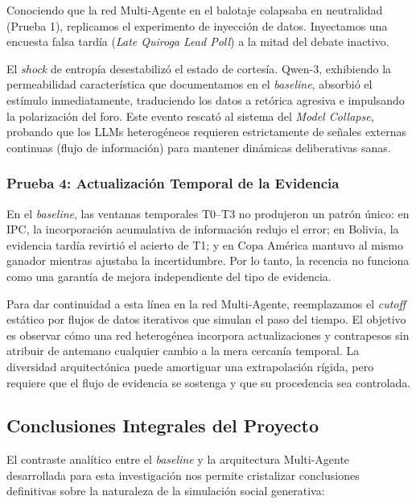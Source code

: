 \documentclass{article}
\begin{document}
Conociendo que la red Multi-Agente en el balotaje colapsaba en neutralidad (Prueba 1), replicamos el experimento de inyección de datos. Inyectamos una encuesta falsa tardía (\textit{Late Quiroga Lead Poll}) a la mitad del debate inactivo.

El \textit{shock} de entropía desestabilizó el estado de cortesía. Qwen-3, exhibiendo la permeabilidad característica que documentamos en el \textit{baseline}, absorbió el estímulo inmediatamente, traduciendo los datos a retórica agresiva e impulsando la polarización del foro. Este evento rescató al sistema del \textit{Model Collapse}, probando que los LLMs heterogéneos requieren estrictamente de señales externas continuas (flujo de información) para mantener dinámicas deliberativas sanas.

\subsubsection{Prueba 4: Actualización Temporal de la Evidencia}

En el \textit{baseline}, las ventanas temporales T0--T3 no produjeron un patrón único: en IPC, la incorporación acumulativa de información redujo el error; en Bolivia, la evidencia tardía revirtió el acierto de T1; y en Copa América mantuvo al mismo ganador mientras ajustaba la incertidumbre. Por lo tanto, la recencia no funciona como una garantía de mejora independiente del tipo de evidencia.

Para dar continuidad a esta línea en la red Multi-Agente, reemplazamos el \textit{cutoff} estático por flujos de datos iterativos que simulan el paso del tiempo. El objetivo es observar cómo una red heterogénea incorpora actualizaciones y contrapesos sin atribuir de antemano cualquier cambio a la mera cercanía temporal. La diversidad arquitectónica puede amortiguar una extrapolación rígida, pero requiere que el flujo de evidencia se sostenga y que su procedencia sea controlada.


\subsection{Conclusiones Integrales del Proyecto}

El contraste analítico entre el \textit{baseline} y la arquitectura Multi-Agente desarrollada para esta investigación nos permite cristalizar conclusiones definitivas sobre la naturaleza de la simulación social generativa:
\end{document}
